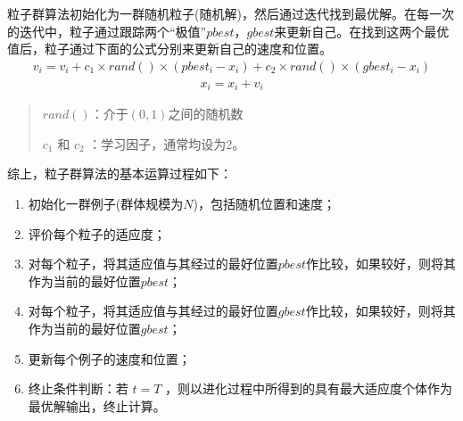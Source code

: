 \documentclass[a4paper,10pt,english]{sphinxmanual}
\begin{document}
\sphinxAtStartPar
粒子群算法初始化为一群随机粒子(随机解)，然后通过迭代找到最优解。在每一次的迭代中，粒子通过跟踪两个“极值”\(pbest，gbest\)来更新自己。在找到这两个最优值后，粒子通过下面的公式分别来更新自己的速度和位置。
\begin{equation*}
\begin{split}    v_i=v_i+c_1\times rand()\times (pbest_i-x_i)+c_2\times rand()\times (gbest_i-x_i)\end{split}
\end{equation*}\begin{equation*}
\begin{split}    x_i=x_i+v_i\end{split}
\end{equation*}\begin{quote}

\sphinxAtStartPar
\(rand()\)：介于\((0,1)\)之间的随机数

\sphinxAtStartPar
\(c_1\) 和 \(c_2\) ：学习因子，通常均设为2。
\end{quote}

\sphinxAtStartPar


\sphinxAtStartPar
{}





\sphinxAtStartPar
综上，粒子群算法的基本运算过程如下：
\begin{enumerate}
%
\item {} 
\sphinxAtStartPar
初始化一群例子(群体规模为\(N\))，包括随机位置和速度；

\item {} 
\sphinxAtStartPar
评价每个粒子的适应度；

\item {} 
\sphinxAtStartPar
对每个粒子，将其适应值与其经过的最好位置\(pbest\)作比较，如果较好，则将其作为当前的最好位置\(pbest\)；

\item {} 
\sphinxAtStartPar
对每个粒子，将其适应值与其经过的最好位置\(gbest\)作比较，如果较好，则将其作为当前的最好位置\(gbest\)；

\item {} 
\sphinxAtStartPar
更新每个例子的速度和位置；

\item {} 
\sphinxAtStartPar
终止条件判断：若 \(t=T\) ，则以进化过程中所得到的具有最大适应度个体作为最优解输出，终止计算。

\end{enumerate}
\end{document}
